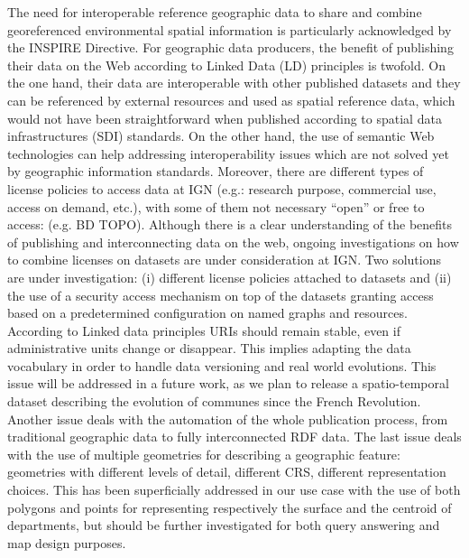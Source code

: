  The need for interoperable reference geographic data to share and combine georeferenced environmental spatial information is particularly acknowledged by the INSPIRE Directive. For geographic data producers, the benefit of publishing their data on the Web according to Linked Data  (LD) principles is twofold. On the one hand, their data are interoperable with other published datasets and they can be referenced by external resources and used as spatial reference data, which would not have been straightforward when published according to spatial data infrastructures (SDI) standards. On the other hand, the use of semantic Web technologies can help addressing interoperability issues which are not solved yet by geographic information standards. 
Moreover, there are different types of license policies to access data at IGN (e.g.: research purpose, commercial use, access on demand, etc.), with some of them not necessary ``open'' or free to access: (e.g. BD TOPO\circledR). Although there is a clear understanding of the benefits of publishing and interconnecting data on the web, ongoing investigations on how to combine licenses on datasets are under consideration at IGN. Two solutions are under investigation: (i) different license policies attached to datasets and (ii) the use of a security access mechanism on top of the datasets granting access based on a predetermined configuration on named graphs and resources. 
According to Linked data principles URIs should remain stable, even if administrative units change or disappear. This implies adapting the data vocabulary in order to handle data versioning and real world evolutions. This issue will be addressed in a future work, as we plan to release a spatio-temporal dataset describing the evolution of communes since the French Revolution. Another issue deals with the automation of the whole publication process, from traditional geographic data to fully interconnected RDF data.
The last issue deals with the use of multiple geometries for describing a geographic feature: geometries with different levels of detail, different CRS, different representation choices. This has been superficially addressed in our use case with the use of both polygons and points for representing respectively the surface and the centroid of departments, but should be further investigated for both query answering and map design purposes.


